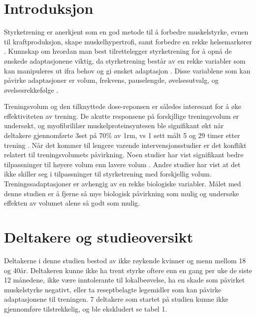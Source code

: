 \documentclass[
]{book}
\begin{document}
\hypertarget{introduksjon-1}{%
\section{Introduksjon}\label{introduksjon-1}}

Styrketrening er anerkjent som en god metode til å forbedre muskelstyrke, evnen til kraftproduksjon, skape muskelhypertrofi, samt forbedre en rekke helsemarkører \citep{kraemer2002}. Kunnskap om hvordan man best tilrettelegger styrketrening for å opnå de ønskede adaptasjonene viktig, da styrketrening består av en rekke variabler som kan manipuleres ut ifra behov og gi ønsket adaptasjon \citep{kraemer2004, bird2005}. Disse variablene som kan påvirke adaptasjoner er volum, frekvens, pauselengde, øvelsesutvalg, og øvelsesrekkefølge \citep{American2009}.

Treningsvolum og den tilknyttede dose-reponsen er således interesant for å øke effektiviteten av trening. De akutte responsene på forskjllige treningsvolum er undersøkt, og myofibrililær muskelproteinsyntesen ble signifikant økt når deltakere gjennomførte 3set på 70\% av 1rm, vs 1 sett målt 5 og 29 timer etter trening \citep{burd2010}. Når det kommer til lengere varende intervensjonsstudier er det konflikt relatert til treningsvolumets påvirkning. Noen studier har vist signifikant bedre tilpassninger til høyere volum enn lavere volum \citep[ ]{rønnestad2007, starkey1996, radaelli2015}. Andre studier har vist at det ikke skiller seg i tilpassninger til styrketrening med forskjellig volum\citep{bottaro2011, galvao2005, mcbride2003}. Treningssadaptasjoner er avhengig av en rekke biologiske variabler. Målet med denne studien er å fjerne så mye biologisk påvirkning som mulig og undersøke effekten av volumet alene så godt som mulig.

\hypertarget{deltakere-og-studieoversikt}{%
\section{Deltakere og studieoversikt}\label{deltakere-og-studieoversikt}}

Deltakerne i denne studien bestod av ikke røykende kvinner og menn mellom 18 og 40år. Deltakeren kunne ikke ha trent styrke oftere enn en gang per uke de siste 12 månedene, ikke være inntolerante til lokalbeøvelse, ha en skade som påvirket muskelstyrke negativt, eller ta reseptbelagte legemidler som kan påvirke adaptasjonene til treningen. 7 deltakere som startet på studien kunne ikke gjennomføre tilstrekkelig, og ble ekskludert se tabel 1.
\end{document}
